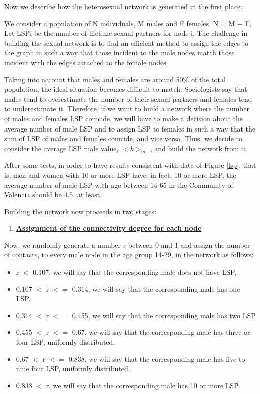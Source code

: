 Now we describe how the heterosexual network is generated in the first place: 

We consider a population of N individuals, M males and F females, N = M + F. Let LSPi be the number of lifetime sexual partners for node i. The challenge in building the sexual network is to find an efficient method to assign the edges to the graph in such a way that those incident to the male nodes match those incident with the edges attached to the female nodes.

Taking into account that males and females are around 50\% of the total population, the ideal situation becomes difficult to match. Sociologists say that males tend to overestimate the number of their sexual partners and
females tend to underestimate it. Therefore, if we want to build a network
where the number of males and females LSP coincide, we will have to make a decision about the average number of male LSP and to assign LSP to females in such a way that the sum of LSP of males and females coincide, and vice versa. Thus, we decide to consider the average LSP male value, $<k>_{m}$ , and build the network from it.

After some tests, in order to have results consistent with data of Figure \ref{lsp}, that is, men and women with 10 or more LSP have, in fact, 10 or more LSP, the average number of male LSP with age between 14-65 in the  Community of Valencia should be 4.5, at least.

Building the network now proceeds in two stages:
\begin{enumerate}
	\item \underline{\textbf{Assignment of the connectivity degree for each node}}
\end{enumerate}
	Now, we randomly generate a number r between 0 and 1 and assign the number of contacts, to every male node in the age group 14-29, in the network as follows:

\begin{itemize}
	\item r $<$ 0.107,  we will say that the corresponding male does not have LSP,
	\item 0.107 $<$ r $<=$ 0.314, we will say that the corresponding male has one LSP,
	\item 0.314 $<$ r $<=$ 0.455, we will say that the corresponding male has two LSP
	\item 0.455 $<$ r $<=$ 0.67, we will say that the corresponding male has three or four LSP, uniformly distributed.
	\item 0.67 $<$ r $<=$ 0.838, we will say that the corresponding male has five to nine four LSP, uniformly distributed.
	\item 0.838 $<$ r, we will say that the corresponding male has 10 or more LSP.
\end{itemize}

